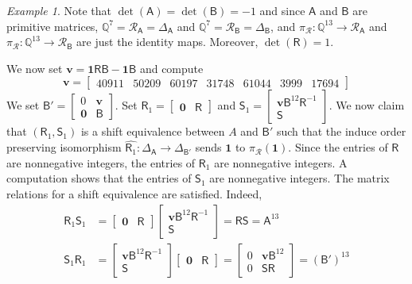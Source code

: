 \documentclass[12pt]{amsbook}%
\theoremstyle{defin}
\theoremstyle{remark}
\newtheorem{examp}[theor]{Example}
\numberwithin{equation}{chapter}
\numberwithin{theor}{section}
\newcommand{\QQ}{\mathbb{Q}}
\begin{document}
\begin{examp}
Note that $\det(\mathsf{A})=\det(\mathsf{B})=-1$ and since $\mathsf{A}$ and $\mathsf{B}$ are primitive matrices, $\QQ^{7} = \mathcal{R}_{\mathsf{A}}=\Delta_\mathsf{A}$ and $\QQ^{7} = \mathcal{R}_\mathsf{B} = \Delta_\mathsf{B}$, and $\pi_\mathcal{R} \colon \QQ^{13} \to \mathcal{R}_\mathsf{A}$ and $\pi_\mathcal{R} \colon \QQ^{13} \to \mathcal{R}_\mathsf{B}$ are just the identity maps.  Moreover, $\det(\mathsf{R})=1$.  

 We now set $\mathbf{v} =  \mathbf{1} \mathsf{R}\mathsf{B}- \mathbf{1}\mathsf{B}$ and compute
 \[
\mathbf{v} =\begin{bmatrix} 40911& 50209& 60197& 31748& 61044& 3999&17694\end{bmatrix}
\]
We set $\mathsf{B}' = \left[\begin{smallmatrix} 0 & \mathbf{v} \\ \mathbf{0} & \mathsf{B} \end{smallmatrix}\right]$. Set $\mathsf{R}_1 = \begin{bmatrix} \mathbf{0} & \mathsf{R} \end{bmatrix}$ and $\mathsf{S}_1 = \left[\begin{smallmatrix} \mathbf{v} \mathsf{B}^{12} \mathsf{R}^{-1}\\ \mathsf{S} \end{smallmatrix}\right]$.  We now claim that $(\mathsf{R}_1, \mathsf{S}_1)$ is a shift equivalence between $A$ and $\mathsf{B}'$ such that the induce order preserving isomorphism $\widehat{\mathsf{R}_1} \colon \Delta_\mathsf{A} \to \Delta_{\mathsf{B}'}$ sends $\mathbf{1}$ to $\pi_\mathcal{R}(\mathbf{1})$.  Since the entries of $\mathsf{R}$ are nonnegative integers, the entries of $\mathsf{R}_1$ are nonnegative integers.  A computation shows that the entries of $\mathsf{S}_1$ are nonnegative integers.  The matrix relations for a shift equivalence are satisfied.  Indeed,
\begin{align*}
\mathsf{R}_1 \mathsf{S}_1 &= \begin{bmatrix} \mathbf{0} & \mathsf{R} \end{bmatrix} \begin{bmatrix} \mathbf{v} \mathsf{B}^{12} \mathsf{R}^{-1}\\ \mathsf{S} \end{bmatrix} = \mathsf{R}\mathsf{S} = \mathsf{A}^{13} \\
\mathsf{S}_1 \mathsf{R}_1 &= \begin{bmatrix} \mathbf{v} \mathsf{B}^{12} \mathsf{R}^{-1}\\ \mathsf{S} \end{bmatrix}\begin{bmatrix} \mathbf{0} & \mathsf{R} \end{bmatrix}  = \begin{bmatrix} 0 & \mathbf{v} \mathsf{B}^{12} \\ 0 & \mathsf{S}\mathsf{R}\end{bmatrix} = (\mathsf{B}')^{13} \\

\end{align*}
\end{examp}
\end{document}
